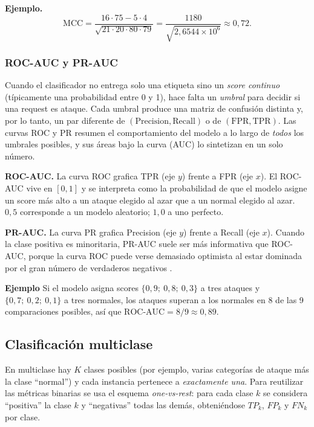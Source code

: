 \documentclass[12pt,oneside]{report}
\begin{document}
\textbf{Ejemplo.}
\[
\mathrm{MCC}=\frac{16\cdot 75 - 5\cdot 4}{\sqrt{21\cdot 20\cdot 80\cdot 79}}
=\frac{1180}{\sqrt{2{,}6544\times 10^{6}}}\approx 0{,}72.
\]

\subsubsection{ROC-AUC y PR-AUC}

Cuando el clasificador no entrega solo una etiqueta sino un \emph{score
continuo} (típicamente una probabilidad entre 0 y 1), hace falta un
\emph{umbral} para decidir si una request es ataque. Cada umbral produce
una matriz de confusión distinta y, por lo tanto, un par diferente de
$(\mathrm{Precision},\mathrm{Recall})$ o de $(\mathrm{FPR},\mathrm{TPR})$.
Las curvas ROC y PR resumen el comportamiento del modelo a lo largo de
\emph{todos} los umbrales posibles, y sus áreas bajo la curva (AUC) lo
sintetizan en un solo número.

\textbf{ROC-AUC.} La curva ROC grafica TPR (eje $y$) frente a FPR (eje
$x$). El ROC-AUC vive en $[0,1]$ y se interpreta como la probabilidad de
que el modelo asigne un score más alto a un ataque elegido al azar que a
un normal elegido al azar. $0{,}5$ corresponde a un modelo aleatorio;
$1{,}0$ a uno perfecto.

\textbf{PR-AUC.} La curva PR grafica Precision (eje $y$) frente a Recall
(eje $x$). Cuando la clase positiva es minoritaria, PR-AUC suele ser más
informativa que ROC-AUC, porque la curva ROC puede verse demasiado
optimista al estar dominada por el gran número de verdaderos negativos
\cite{saito_pr_auc}.

\textbf{Ejemplo} Si el modelo asigna scores
$\{0{,}9;\ 0{,}8;\ 0{,}3\}$ a tres ataques y
$\{0{,}7;\ 0{,}2;\ 0{,}1\}$ a tres normales, los ataques superan a los
normales en 8 de las 9 comparaciones posibles, así que
$\mathrm{ROC\text{-}AUC}=8/9\approx 0{,}89$.

\subsection{Clasificación multiclase}

En multiclase hay $K$ clases posibles (por ejemplo, varias categorías de
ataque más la clase ``normal'') y cada instancia pertenece a
\emph{exactamente una}. Para reutilizar las métricas binarias se usa el
esquema \emph{one-vs-rest}: para cada clase $k$ se considera ``positiva''
la clase $k$ y ``negativas'' todas las demás, obteniéndose $TP_k$,
$FP_k$ y $FN_k$ por clase.
\end{document}
